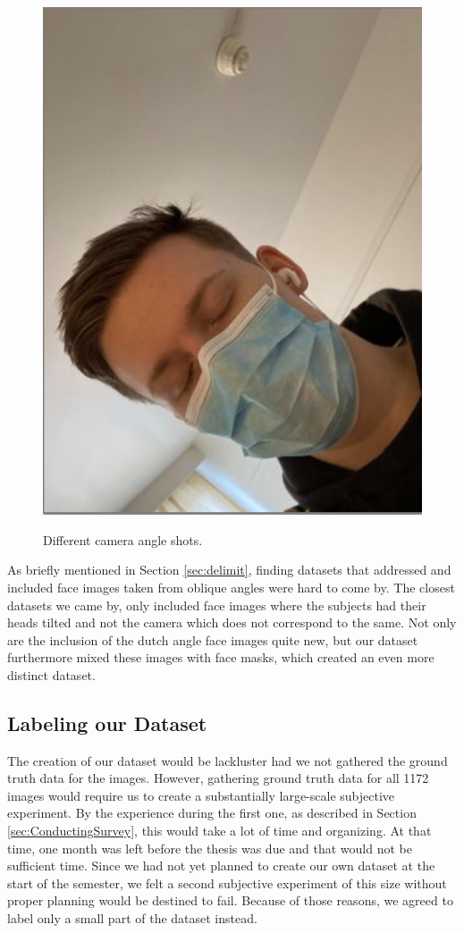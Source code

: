 \begin{figure}[h]
        {\includegraphics[scale = 0.295]{figures/0699.png}}
    \caption{Different camera angle shots.}
    \label{fig:tilt}
\end{figure}

As briefly mentioned in Section \ref{sec:delimit}, finding datasets that addressed and included face images taken from oblique angles were hard to come by. The closest datasets we came by, only included face images where the subjects had their heads tilted and not the camera which does not correspond to the same. Not only are the inclusion of the dutch angle face images quite new, but our dataset furthermore mixed these images with face masks, which created an even more distinct dataset. 

\subsection*{Labeling our Dataset}
The creation of our dataset would be lackluster had we not gathered the ground truth data for the images. However, gathering ground truth data for all 1172 images would require us to create a substantially large-scale subjective experiment. By the experience during the first one, as described in Section \ref{sec:ConductingSurvey}, this would take a lot of time and organizing. At that time, one month was left before the thesis was due and that would not be sufficient time. Since we had not yet planned to create our own dataset at the start of the semester, we felt a second subjective experiment of this size without proper planning would be destined to fail. Because of those reasons, we agreed to label only a small part of the dataset instead.  

